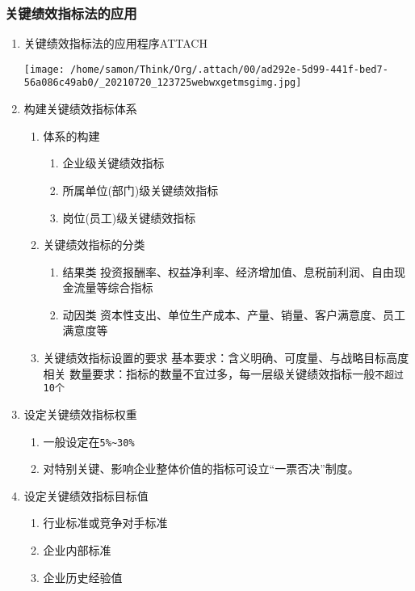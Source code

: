 \documentclass[11pt]{article}
\begin{document}
\subsubsection{关键绩效指标法的应用}
\label{sec:org5a3c557}
\begin{enumerate}
\item 关键绩效指标法的应用程序\hfill{}\textsc{ATTACH}
\label{sec:orgebe7940}
\begin{center}
\texttt{[image: /home/samon/Think/Org/.attach/00/ad292e-5d99-441f-bed7-56a086c49ab0/\_20210720\_123725webwxgetmsgimg.jpg]}
\end{center}
\item 构建关键绩效指标体系
\label{sec:org88210fa}
\begin{enumerate}
\item 体系的构建
\label{sec:orgc397126}
\begin{enumerate}
\item 企业级关键绩效指标
\item 所属单位(部门)级关键绩效指标
\item 岗位(员工)级关键绩效指标
\end{enumerate}
\item 关键绩效指标的分类
\label{sec:orgd25e9a6}
\begin{enumerate}
\item 结果类
投资报酬率、权益净利率、经济增加值、息税前利润、自由现金流量等综合指标
\item 动因类
资本性支出、单位生产成本、产量、销量、客户满意度、员工满意度等
\end{enumerate}
\item 关键绩效指标设置的要求
\label{sec:org68776d0}
基本要求：含义明确、可度量、与战略目标高度相关
数量要求：指标的数量不宜过多，每一层级关键绩效指标一般\texttt{不超过10个}
\end{enumerate}
\item 设定关键绩效指标权重
\label{sec:orgf851589}
\begin{enumerate}
\item 一般设定在\texttt{5\%\textasciitilde{}30\%}
\item 对特别关键、影响企业整体价值的指标可设立“一票否决”制度。
\end{enumerate}
\item 设定关键绩效指标目标值
\label{sec:org8057e98}
\begin{enumerate}
\item 行业标准或竞争对手标准
\item 企业内部标准
\item 企业历史经验值
\end{enumerate}
\end{enumerate}
\end{document}
